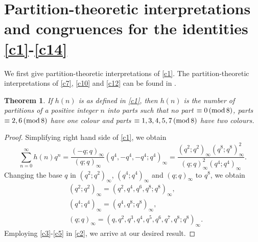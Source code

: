 \documentclass[12pt]{article}
\renewcommand{\(}{\left\(}
\renewcommand{\)}{\right\)}
\renewcommand{\[}{\left[}
\renewcommand{\]}{\right]}
\renewcommand{\pmod}[1]{\,(\textup{mod}\,#1)}
\numberwithin{equation}{section}
\theoremstyle{plain}
\newtheorem{theorem}{Theorem}[section]
\begin{document}
\section{Partition-theoretic interpretations and congruences for the identities \eqref{c1}-\eqref{c14}}
We first give partition-theoretic interpretations of \eqref{c1}. The partition-theoretic interpretations of \eqref{c7}, \eqref{c10} and \eqref{c12} can be found in \cite{SN}.
\begin{theorem}
If $h(n)$ is as defined in \eqref{c1}, then $h(n)$ is the number of partitions of a positive integer $n$ into parts such that no part $\equiv0\pmod{8}$, parts $\equiv 2,6\pmod{8}$ have one colour and parts $\equiv 1,3,4,5,7\pmod{8}$ have two colours.
\end{theorem}
\begin{proof}
 Simplifying right hand side of \eqref{c1}, we obtain
\begin{equation}\label{c2}
\sum_{n=0}^{\infty}h(n)q^n=\dfrac{(-q;q)_\infty}{(q;q)_\infty}(q^4,-q^4,-q^4;q^4)_\infty =\dfrac{(q^2;q^2)_\infty (q^8;q^8)_{\infty}^2}{(q;q)_{\infty}^2 (q^4;q^4)_{\infty}}.
\end{equation}
Changing the base $q$ in $(q^2;q^2)_\infty$, $(q^4;q^4)_\infty$ and $(q;q)_\infty$ to $q^8$, we obtain
\begin{align}\label{c3}
& (q^2;q^2)_\infty=(q^2,q^4,q^6,q^8;q^8)_\infty,\\
\label{c4}
& (q^4;q^4)_\infty=(q^4,q^8;q^8)_\infty,\\ 
\label{c5}
& (q;q)_\infty=(q,q^2,q^3,q^4,q^5,q^6,q^7,q^8;q^8)_\infty.
\end{align}
Employing \eqref{c3}-\eqref{c5} in \eqref{c2}, we arrive at our desired result.
\end{proof}
\end{document}
